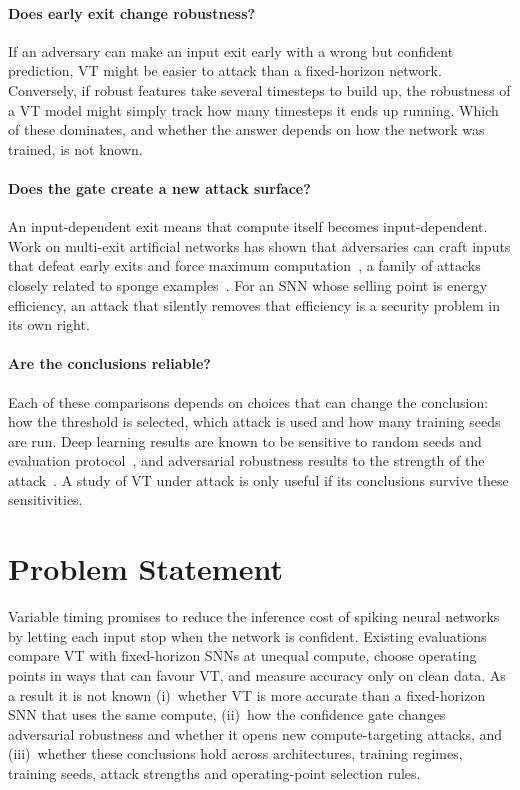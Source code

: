 \paragraph{Does early exit change robustness?} If an adversary can make an input exit early with a wrong but confident prediction, VT might be easier to attack than a fixed-horizon network. Conversely, if robust features take several timesteps to build up, the robustness of a VT model might simply track how many timesteps it ends up running. Which of these dominates, and whether the answer depends on how the network was trained, is not known.

\paragraph{Does the gate create a new attack surface?} An input-dependent exit means that compute itself becomes input-dependent. Work on multi-exit artificial networks has shown that adversaries can craft inputs that defeat early exits and force maximum computation~\cite{haque2020ilfo, hong2021panda}, a family of attacks closely related to sponge examples~\cite{shumailov2021sponge}. For an SNN whose selling point is energy efficiency, an attack that silently removes that efficiency is a security problem in its own right.

\paragraph{Are the conclusions reliable?} Each of these comparisons depends on choices that can change the conclusion: how the threshold is selected, which attack is used and how many training seeds are run. Deep learning results are known to be sensitive to random seeds and evaluation protocol~\cite{henderson2018deep, bouthillier2021accounting, picard2021torch}, and adversarial robustness results to the strength of the attack~\cite{carlini2019evaluating, croce2021robustbench}. A study of VT under attack is only useful if its conclusions survive these sensitivities.

\section{Problem Statement}
\label{sec:intro-problem}

Variable timing promises to reduce the inference cost of spiking neural networks by letting each input stop when the network is confident. Existing evaluations compare VT with fixed-horizon SNNs at unequal compute, choose operating points in ways that can favour VT, and measure accuracy only on clean data. As a result it is not known (i)~whether VT is more accurate than a fixed-horizon SNN that uses the same compute, (ii)~how the confidence gate changes adversarial robustness and whether it opens new compute-targeting attacks, and (iii)~whether these conclusions hold across architectures, training regimes, training seeds, attack strengths and operating-point selection rules.


